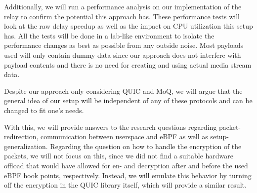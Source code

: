 Additionally, we will run a performance analysis on our implementation of the relay to confirm the potential this 
approach has.
These performance tests will look at the raw delay speedup as well as the impact on CPU utilization this 
setup has.
All the tests will be done in a lab-like environment to isolate the performance changes as best as possible
from any outside noise.
Most payloads used will only contain dummy data since our approach does not interfere with payload contents 
and there is no need for creating and using actual media stream data.

Despite our approach only considering QUIC and MoQ, we will argue that the general idea of our setup will be independent of
any of these protocols and can be changed to fit one's needs.

With this, we will provide answers to the research questions regarding packet-redirection, communication between userspace and eBPF
as well as setup-generalization.
Regarding the question on how to handle the encryption of the packets, we will not focus on this, since we did not find a suitable
hardware offload that would have allowed for en- and decryption after and before the used eBPF hook points, respectively.
Instead, we will emulate this behavior by turning off the encryption in the QUIC library itself, which will provide a similar result.

